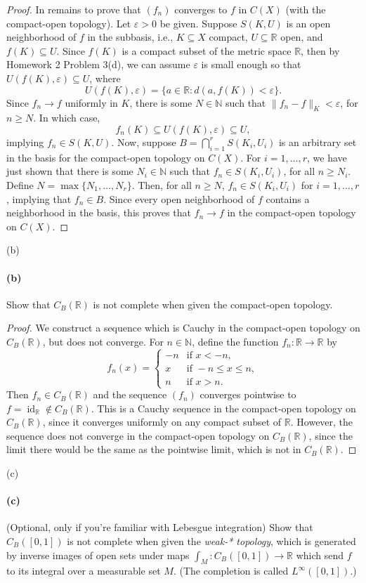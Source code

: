 \documentclass[12pt]{article}
\newlength{\myparskip}
\newenvironment{fullbox}{\begin{lrbox}{\savefullbox}\begin{minipage}{\dimexpr\textwidth-2\fboxsep\relax}\setlength{\parskip}{\myparskip}}{\end{minipage}\end{lrbox}\framebox[\textwidth]{\usebox{\savefullbox}}}
\newenvironment{pbox}[1][]{\begin{fullbox}\ifx#1\empty\else\paragraph{#1}\fi}{\end{fullbox}}
\newcommand{\N}{\mathbb{N}}
\newcommand{\R}{\mathbb{R}}
\newcommand{\eps}{\varepsilon}
\newcommand{\<}{\langle}
\renewcommand{\>}{\rangle}
\DeclareMathOperator{\id}{id}
\begin{document}
\begin{proof}
    In remains to prove that $(f_n)$ converges to $f$ in $C(X)$ (with the compact-open topology). Let $\eps > 0$ be given. Suppose $S(K, U)$ is an open neighborhood of $f$ in the subbasis, i.e., $K \subseteq X$ compact, $U \subseteq \R$ open, and $f(K) \subseteq U$. Since $f(K)$ is a compact subset of the metric space $\R$, then by Homework 2 Problem 3(d), we can assume $\eps$ is small enough so that $U(f(K), \eps) \subseteq U$, where
    \[
        U(f(K), \eps) = \{a \in \R : d(a, f(K)) < \eps\}.
    \]
    Since $f_n \to f$ uniformly in $K$, there is some $N \in \N$ such that $\|f_n - f\|_K < \eps$, for $n \geq N$. In which case,
    \[
        f_n(K) \subseteq U(f(K), \eps) \subseteq U,
    \]
    implying $f_n \in S(K, U)$. Now, suppose $B = \bigcap_{i=1}^{r} S(K_i, U_i)$ is an arbitrary set in the basis for the compact-open topology on $C(X)$. For $i = 1, \dots, r$, we have just shown that there is some $N_i \in \N$ such that $f_n \in S(K_i, U_i)$, for all $n \geq N_i$. Define $N = \max\{N_1, \dots, N_r\}$. Then, for all $n \geq N$, $f_n \in S(K_i, U_i)$ for $i = 1, \dots, r$, implying that $f_n \in B$. Since every open neighborhood of $f$ contains a neighborhood in the basis, this proves that $f_n \to f$ in the compact-open topology on $C(X)$.

\end{proof}

\begin{pbox}[(b)]
    Show that $C_B(\mathbb R)$ is not complete when given the compact-open topology.
\end{pbox}

\begin{proof}
    We construct a sequence which is Cauchy in the compact-open topology on $C_B(\R)$, but does not converge. For $n \in \N$, define the function $f_n : \R \to \R$ by
    \[
        f_n(x) = \begin{cases}
            -n &\text{if } x < -n, \\
            x &\text{if } -n \leq x \leq n, \\
            n &\text{if } x > n.
        \end{cases}
    \]
    Then $f_n \in C_B(\R)$ and the sequence $(f_n)$ converges pointwise to $f = \id_\R \notin C_B(\R)$. This is a Cauchy sequence in the compact-open topology on $C_B(\R)$, since it converges uniformly on any compact subset of $\R$. However, the sequence does not converge in the compact-open topology on $C_B(\R)$, since the limit there would be the same as the pointwise limit, which is not in $C_B(\R)$.

\end{proof}

\begin{pbox}[(c)]
    (Optional, only if you're familiar with Lebesgue integration) Show that $C_B([0,1])$ is not complete when given the \emph{weak-* topology}, which is generated by inverse images of open sets under maps $\int_M:C_B([0,1]) \to \mathbb{R}$ which send $f$ to its integral over a measurable set $M$.  (The completion is called $L^\infty([0,1])$.)
\end{pbox}
\end{document}
